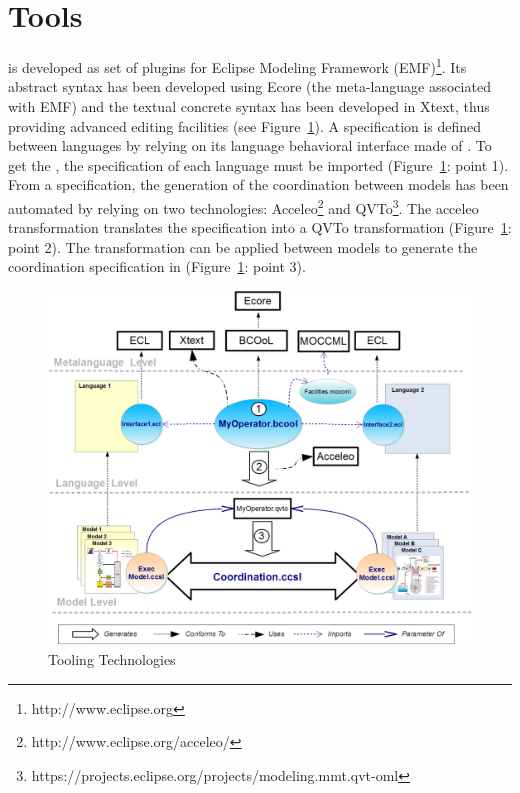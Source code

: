 \section{Tools}
\label{section:bcoollengbench}
\bcool is developed as set of plugins for Eclipse Modeling Framework (EMF)\footnote{http://www.eclipse.org}. Its abstract syntax has been developed using Ecore (\ie the meta-language associated with EMF) and the textual concrete  syntax has been developed in Xtext, thus providing advanced editing facilities (see Figure~\ref{fig:bcooltechnos}). A \bcool specification is defined between languages by relying on its language behavioral interface made of \dse. To get the \dse, the \ecl specification of each language must be imported (Figure~\ref{fig:bcooltechnos}: point 1). From a \bcool specification, the generation of the coordination between models has been automated by relying on two technologies: Acceleo\footnote{http://www.eclipse.org/acceleo/} and QVTo\footnote{https://projects.eclipse.org/projects/modeling.mmt.qvt-oml}. The acceleo transformation translates the \bcool specification into a QVTo transformation (Figure~\ref{fig:bcooltechnos}: point 2). The transformation can be applied between models to generate the coordination specification in \ccsl (Figure~\ref{fig:bcooltechnos}: point 3).    
	
\begin{figure}[h]
		\begin{center}
			\includegraphics[width=1\textwidth]{bcool/figs/bcooltechnos.png}
			\caption{\bcool Tooling Technologies}
			\label{fig:bcooltechnos}
		\end{center}
\end{figure}
	
